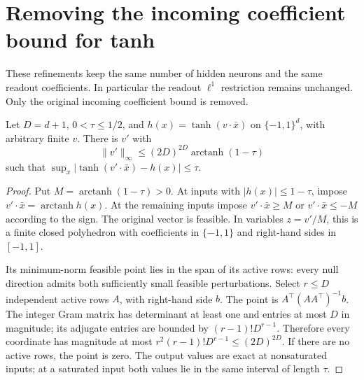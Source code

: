 \section{Removing the incoming coefficient bound for tanh}
\label{sec:l1-compactification}
These refinements keep the same number of hidden neurons and the same
readout coefficients. In particular the readout $\ell^1$ restriction remains
unchanged. Only the original incoming coefficient bound is removed.

\begin{lemma}
\label{lem:l1-Boolean-ridge}
Let $D=d+1$, $0<\tau\le1/2$, and
$h(x)=\tanh(v\cdot\bar x)$ on $\{-1,1\}^d$, with arbitrary finite $v$.
There is $v'$ with
\[
 \|v'\|_\infty\le (2D)^{2D}\operatorname{arctanh}(1-\tau)
\]
such that $\sup_x|\tanh(v'\cdot\bar x)-h(x)|\le\tau$.
\end{lemma}
\begin{proof}
Put $M=\operatorname{arctanh}(1-\tau)>0$. At inputs with
$|h(x)|\le1-\tau$, impose $v'\cdot\bar x=\operatorname{arctanh}h(x)$.
At the remaining inputs impose $v'\cdot\bar x\ge M$ or
$v'\cdot\bar x\le-M$ according to the sign. The original vector is
feasible. In variables $z=v'/M$, this is a finite closed polyhedron
with coefficients in $\{-1,1\}$ and right-hand sides in $[-1,1]$.

Its minimum-norm feasible point lies in the span of its active rows:
every null direction admits both sufficiently small feasible
perturbations. Select $r\le D$ independent active rows $A$, with
right-hand side $b$. The point is $A^\top(AA^\top)^{-1}b$.
The integer Gram matrix has determinant at least one and entries at
most $D$ in magnitude; its adjugate entries are bounded by
$(r-1)!D^{r-1}$. Therefore every coordinate has magnitude at most
$r^2(r-1)!D^{r-1}\le(2D)^{2D}$. If there are no active rows, the point
is zero. The output values are exact at nonsaturated inputs; at a
saturated input both values lie in the same interval of length $\tau$.
\end{proof}

